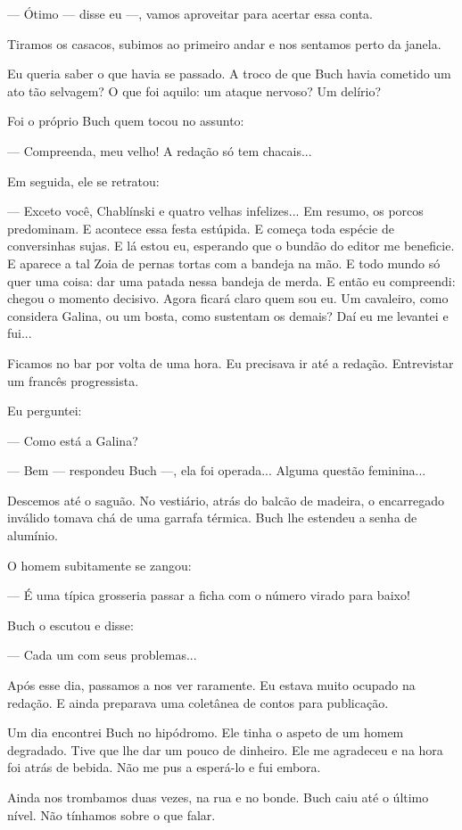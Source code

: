 --- Ótimo --- disse eu ---, vamos aproveitar para acertar essa conta.

Tiramos os casacos, subimos ao primeiro andar e nos sentamos perto da
janela.

Eu queria saber o que havia se passado. A troco de que Buch havia
cometido um ato tão selvagem? O que foi aquilo: um ataque nervoso? Um
delírio?

Foi o próprio Buch quem tocou no assunto:

--- Compreenda, meu velho! A redação só tem chacais...

Em seguida, ele se retratou:

--- Exceto você, Chablínski e quatro velhas infelizes... Em resumo, os
porcos predominam. E acontece essa festa estúpida. E começa toda espécie
de conversinhas sujas. E lá estou eu, esperando que o bundão do editor
me beneficie. E aparece a tal Zoia de pernas tortas com a bandeja na
mão. E todo mundo só quer uma coisa: dar uma patada nessa bandeja de
merda. E então eu compreendi: chegou o momento decisivo. Agora ficará
claro quem sou eu. Um cavaleiro, como considera Galina, ou um bosta,
como sustentam os demais? Daí eu me levantei e fui...

Ficamos no bar por volta de uma hora. Eu precisava ir até a redação.
Entrevistar um francês progressista.

Eu perguntei:

--- Como está a Galina?

--- Bem --- respondeu Buch ---, ela foi operada... Alguma questão
feminina...

Descemos até o saguão. No vestiário, atrás do balcão de madeira, o
encarregado inválido tomava chá de uma garrafa térmica. Buch lhe
estendeu a senha de alumínio.

O homem subitamente se zangou:

--- É uma típica grosseria passar a ficha com o número virado para
baixo!

Buch o escutou e disse:

--- Cada um com seus problemas...

Após esse dia, passamos a nos ver raramente. Eu estava muito ocupado na
redação. E ainda preparava uma coletânea de contos para publicação.

Um dia encontrei Buch no hipódromo. Ele tinha o aspeto de um homem
degradado. Tive que lhe dar um pouco de dinheiro. Ele me agradeceu e na
hora foi atrás de bebida. Não me pus a esperá-lo e fui embora.

Ainda nos trombamos duas vezes, na rua e no bonde. Buch caiu até o
último nível. Não tínhamos sobre o que falar.

